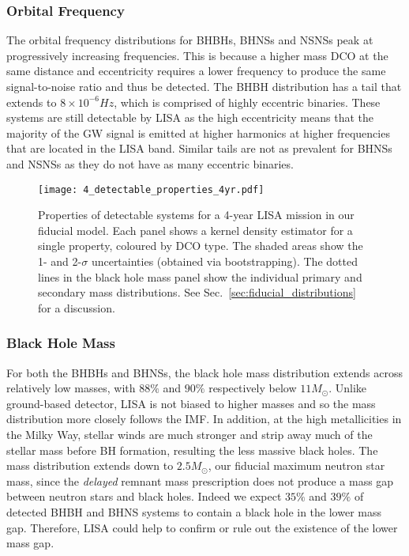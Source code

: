 \subsubsection{Orbital Frequency}
The orbital frequency distributions for BHBHs, BHNSs and NSNSs peak at progressively increasing frequencies. This is because a higher mass DCO at the same distance and eccentricity requires a lower frequency to produce the same signal-to-noise ratio and thus be detected. The BHBH distribution has a tail that extends to $8 \times 10^{-6} \unit{Hz}$, which is comprised of highly eccentric binaries. These systems are still detectable by LISA as the high eccentricity means that the majority of the GW signal is emitted at higher harmonics at higher frequencies that are located in the LISA band. Similar tails are not as prevalent for BHNSs and NSNSs as they do not have as many eccentric binaries.

\begin{figure*}[t]
    \centering
    \texttt{[image: 4\_detectable\_properties\_4yr.pdf]}
    \caption{Properties of detectable systems for a 4-year LISA mission in our fiducial model. Each panel shows a kernel density estimator for a single property, coloured by DCO type. The shaded areas show the 1- and 2-$\sigma$ uncertainties (obtained via bootstrapping). The dotted lines in the black hole mass panel show the individual primary and secondary mass distributions. See Sec.~\ref{sec:fiducial_distributions} for a discussion.}
    \label{fig:fiducial_pdf_distributions}
\end{figure*}

\subsubsection{Black Hole Mass}
For both the BHBHs and BHNSs, the black hole mass distribution extends across relatively low masses, with $88\%$ and $90\%$ respectively below $11 \unit{M_{\odot}}$. Unlike ground-based detector, LISA is not biased to higher masses and so the mass distribution more closely follows the IMF. In addition, at the high metallicities in the Milky Way, stellar winds are much stronger and strip away much of the stellar mass before BH formation, resulting the less massive black holes. The mass distribution extends down to $2.5 \unit{M_{\odot}}$, our fiducial maximum neutron star mass, since the \citet{Fryer+2012} \textit{delayed} remnant mass prescription does not produce a mass gap between neutron stars and black holes. Indeed we expect $35\%$ and $39\%$ of detected BHBH and BHNS systems to contain a black hole in the lower mass gap. Therefore, LISA could help to confirm or rule out the existence of the lower mass gap.

